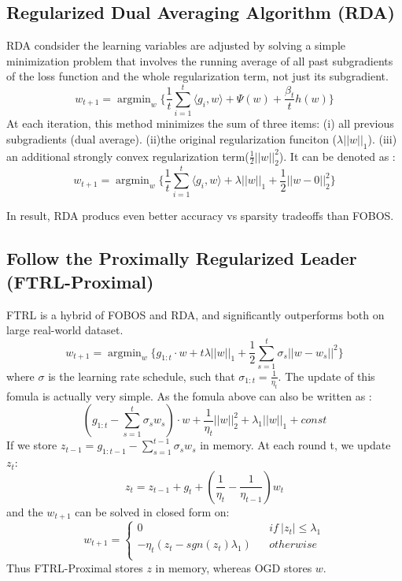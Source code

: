\documentclass{article}
\begin{document}
\subsection{Regularized Dual Averaging Algorithm (RDA)}
RDA\cite{DBLP:journals/jmlr/Xiao10} condsider the learning variables are adjusted by solving a simple minimization problem that involves the running average of all past subgradients of the loss function and
the whole regularization term, not just its subgradient.
$$w_{t+1}=\mathop{\arg\min}_{w} \{\frac{1}{t}\sum_{i=1}^{t}\langle g_{i},w\rangle +\Psi(w)+\frac{\beta_{t}}{t}h(w)  \}$$
At each iteration, this method minimizes the sum of three items: (\textrm{i}) all previous subgradients (dual average). (\textrm{ii})the original regularization funciton ($\lambda ||w||_{1}$). (\textrm{iii}) an additional strongly convex regularization term($\frac{1}{2}||w||^{2}_{2}$). It can be denoted as :
$$w_{t+1}=\mathop{\arg\min}_{w} \{\frac{1}{t}\sum_{i=1}^{t}\langle g_{i},w\rangle +\lambda ||w||_{1}+\frac{1}{2}||w-0||^{2}_{2}  \}$$

In result, RDA producs even better accuracy vs sparsity tradeoffs than FOBOS. 

\subsection{Follow the Proximally Regularized Leader (FTRL-Proximal)}
FTRL \cite{DBLP:journals/corr/abs-1009-3240} is a hybrid of FOBOS and RDA, and  significantly outperforms both on large real-world dataset.
$$w_{t+1}=\mathop{\arg\min}_{w} \{ g_{1:t} \cdot w+t\lambda ||w||_{1} +\frac{1}{2} \sum_{s=1}^{t}\sigma_{s} || w-w_{s}||^{2} \}$$
where $\sigma$ is the learning rate schedule, such that $\sigma_{1:t}=\frac{1}{\eta_{t}}$.
The update of this fomula is actually very simple. As the fomula above can also be written as :
$$(g_{1:t}-\sum_{s=1}^{t}\sigma_{s}w_{s}) \cdot w 
+\frac{1}{\eta_{t}}||w||_{2}^{2}
+\lambda_{1}||w||_{1}
+const$$
If we store $z_{t-1}=g_{1:t-1}-\sum_{s=1}^{t-1}\sigma_{s}w_{s}$ in memory. At each round t, we update $z_{t}$:
$$z_{t}=z_{t-1}+g_{t}+(\frac{1}{\eta_{t}}-\frac{1}{\eta_{t-1}})w_{t}$$
and the $w_{t+1}$ can be solved in closed form on: 
$$w_{t+1}=\left\{  
\begin{array}{lcl}
0 & & {if \ |z_{t}|\leq \lambda_{1} } \\
-\eta_{t}(z_{t}-sgn(z_{t})\lambda_{1}) & & {otherwise} \\
\end{array} \right. $$
Thus FTRL-Proximal stores $z$ in memory, whereas OGD stores $w$. 
\end{document}
